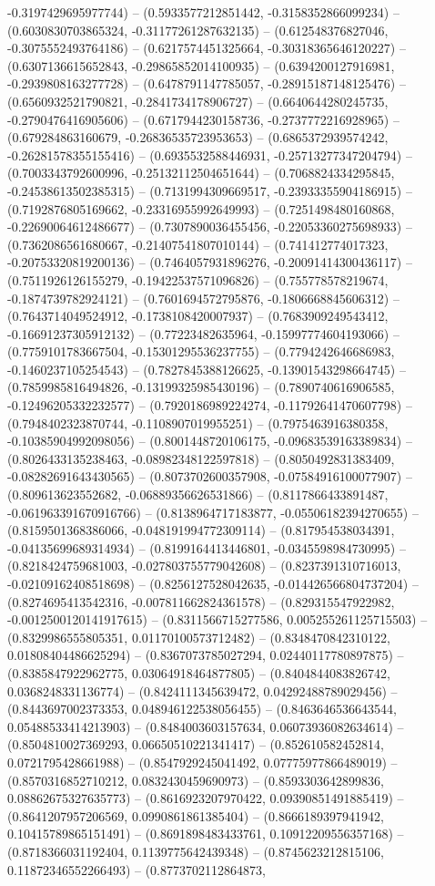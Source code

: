 -0.3197429695977744) -- (0.5933577212851442, -0.3158352866099234) -- (0.6030830703865324, -0.31177261287632135) -- (0.612548376827046, -0.3075552493764186) -- (0.6217574451325664, -0.30318365646120227) -- (0.6307136615652843, -0.29865852014100935) -- (0.6394200127916981, -0.2939808163277728) -- (0.6478791147785057, -0.28915187148125476) -- (0.6560932521790821, -0.2841734178906727) -- (0.6640644280245735, -0.2790476416905606) -- (0.6717944230158736, -0.2737772216928965) -- (0.679284863160679, -0.26836535723953653) -- (0.6865372939574242, -0.26281578355155416) -- (0.6935532588446931, -0.25713277347204794) -- (0.7003343792600996, -0.25132112504651644) -- (0.7068824334295845, -0.24538613502385315) -- (0.7131994309669517, -0.23933355904186915) -- (0.7192876805169662, -0.23316955992649993) -- (0.7251498480160868, -0.22690064612486677) -- (0.7307890036455456, -0.22053360275698933) -- (0.7362086561680667, -0.21407541807010144) -- (0.741412774017323, -0.20753320819200136) -- (0.7464057931896276, -0.20091414300436117) -- (0.7511926126155279, -0.19422537571096826) -- (0.755778578219674, -0.1874739782924121) -- (0.7601694572795876, -0.1806668845606312) -- (0.7643714049524912, -0.1738108420007937) -- (0.7683909249543412, -0.16691237305912132) -- (0.77223482635964, -0.15997774604193066) -- (0.7759101783667504, -0.15301295536237755) -- (0.7794242646686983, -0.1460237105254543) -- (0.7827845388126625, -0.13901543298664745) -- (0.7859985816494826, -0.13199325985430196) -- (0.7890740616906585, -0.12496205332232577) -- (0.7920186989224274, -0.11792641470607798) -- (0.7948402323870744, -0.1108907019955251) -- (0.7975463916380358, -0.10385904992098056) -- (0.8001448720106175, -0.09683539163389834) -- (0.8026433135238463, -0.08982348122597818) -- (0.8050492831383409, -0.08282691643430565) -- (0.8073702600357908, -0.07584916100077907) -- (0.809613623552682, -0.06889356626531866) -- (0.8117866433891487, -0.061963391670916766) -- (0.8138964717183877, -0.05506182394270655) -- (0.8159501368386066, -0.048191994772309114) -- (0.817954538034391, -0.04135699689314934) -- (0.8199164413446801, -0.0345598984730995) -- (0.8218424759681003, -0.027803755779042608) -- (0.8237391310716013, -0.02109162408518698) -- (0.8256127528042635, -0.014426566804737204) -- (0.8274695413542316, -0.007811662824361578) -- (0.829315547922982, -0.0012500120141917615) -- (0.8311566715277586, 0.005255261125715503) -- (0.8329986555805351, 0.01170100573712482) -- (0.8348470842310122, 0.01808404486625294) -- (0.8367073785027294, 0.02440117780897875) -- (0.8385847922962775, 0.03064918464877805) -- (0.8404844083826742, 0.0368248331136774) -- (0.8424111345639472, 0.04292488789029456) -- (0.8443697002373353, 0.048946122538056455) -- (0.8463646536643544, 0.05488533414213903) -- (0.8484003603157634, 0.06073936082634614) -- (0.8504810027369293, 0.06650510221341417) -- (0.852610582452814, 0.0721795428661988) -- (0.8547929245041492, 0.07775977866489019) -- (0.8570316852710212, 0.0832430459690973) -- (0.8593303642899836, 0.08862675327635773) -- (0.8616923207970422, 0.09390851491885419) -- (0.8641207957206569, 0.0990861861385404) -- (0.8666189397941942, 0.10415789865151491) -- (0.8691898483433761, 0.10912209556357168) -- (0.8718366031192404, 0.1139775642439348) -- (0.8745623212815106, 0.11872346552266493) -- (0.8773702112864873, 